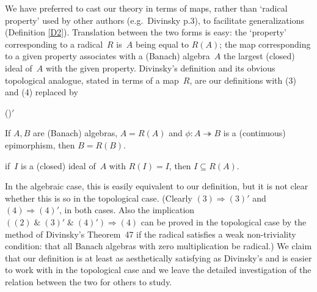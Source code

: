 \documentclass[11pt]{article}
\newcounter{arbdashenum}
\newenvironment{arbdashenumerate}{\begin{list}{{\rm(\arabic{arbdashenum})}$'$}%
{\usecounter{arbdashenum}}}{\end{list}}
\newcommand{\sseq}{\subseteq}
\newcommand{\closure}[1]{\overline{#1}}
\newcommand{\onto}{\twoheadrightarrow}
\newcommand{\idealin}{\lhd}
\newcommand{\Detail}[1]{}
\begin{document}
We have preferred to cast our theory in terms of maps, rather than `radical
property' used by other authors (e.g.\ Divinsky \cite{Divinskybk} p.3),
to facilitate generalizations (Definition \ref{D2}).  Translation between the
two forms is easy: the `property' corresponding to a radical~$R$ is~$A$ being
equal to $R(A)$; the map corresponding to a given property associates with a
(Banach) algebra~$A$ the largest (closed) ideal of~$A$ with the given property.
Divinsky's definition and its obvious topological analogue, stated in terms
of a map~$R$,  are our definitions with (3) and (4) replaced by
\begin{arbdashenumerate}
\addtocounter{arbdashenum}{2}
\item If $A,B$ are (Banach) algebras, $A=R(A)$ and $\phi:A \onto B$ is a
(continuous) epimorphism, then $B=R(B)$.
\item if~$I$ is a (closed) ideal of~$A$ with $R(I) = I$, then $I \sseq R(A)$.
\end{arbdashenumerate}
In the algebraic case, this is easily equivalent to our definition, but it is
not clear whether this is so in the topological case.  (Clearly $(3) \Rightarrow
(3)'$ and $(4) \Rightarrow (4)'$, in both cases.   Also the implication
$((2)\;\&\;(3)'\;\&\;(4)') \Rightarrow (4)$ can be proved in the topological case by the
method of Divinsky's Theorem~47 if the radical satisfies a weak
non-triviality condition:  that all Banach algebras with zero multiplication be
radical.)   We claim that our definition is at least as aesthetically satisfying
as Divinsky's and is easier to work with in the topological case and we leave the
detailed investigation of the relation between the two for others to study.

\Detail{In the algebraic case, $((1)\;\&\;(3)'\;\&\;(4)')\Rightarrow (3)$: apply
$(3)'$ to the restricted mapping $\phi: R(A) \onto \phi(R(A))$.  Then~(1)
implies $R(\phi(R(A))) = \phi(R(A))$.  Since $\phi:A \onto B$ is surjective and
$R(A) \idealin A$, we have $\phi(R(A)) \idealin B$.  An application of~$(4)'$
then gives $\phi(R(A)) \sseq R(B)$.    However, in the topological case,
$\phi(R(A))$ might not be closed, so neither~$(3)'$ nor~$(4)'$ would
necessarily apply.

In the algebraic case, also, $((2)\;\&\;(3)'\;\&\;(4)')\Rightarrow (4)$ by
Divinsky's Theorem~47 and its first corollary.  In the topological case,
however, the proof of Theorem~47 fails because sums and products of closed
subspaces are not necessarily closed.   If all null algebras are radical, the
section of Divinsky's proof which shows that $[xR(I)+R(I)]/R(I)$ is null goes
through as before.  We deduce that $\closure{xR(I)+R(I)}/R(I)$ is null and
therefore radical.  The proof concludes as before.}
\end{document}
